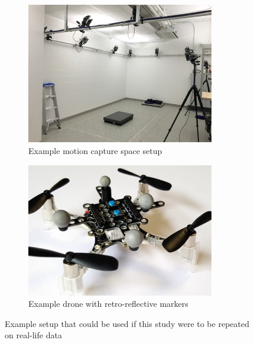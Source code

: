 \documentclass[letterpaper, paper,11pt]{AAS}	%
\begin{document}
\begin{figure}[htb]
\centering
\begin{subfigure}{.5\textwidth}
	\centering
	\includegraphics[width=0.9\textwidth]{Figures/ViconMotionCaptureSpace}
	\caption{Example motion capture space setup\cite{ViconMotionCaptureSpace}}
	\label{fig:ViconMotionCaptureSpace}
\end{subfigure}%
\begin{subfigure}{.5\textwidth}
	\centering
	\includegraphics[width=0.9\textwidth]{Figures/MotionCaptureDrone}
	\caption{Example drone with retro-reflective markers\cite{MotionCaptureDrone}}
	\label{fig:MotionCaptureDrone}
\end{subfigure}
\caption{Example setup that could be used if this study were to be repeated on real-life data}
\label{fig:MotionCaptureExample}
\end{figure}
\end{document}
